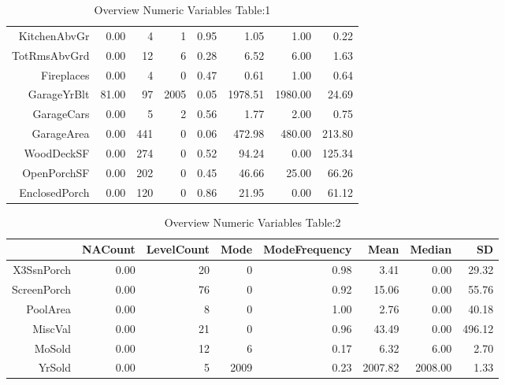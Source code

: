 \begin{table}[ht]
\begin{tabular}{rrrrrrrr}
  KitchenAbvGr & 0.00 &   4 &   1 & 0.95 & 1.05 & 1.00 & 0.22 \\ 
  TotRmsAbvGrd & 0.00 &  12 &   6 & 0.28 & 6.52 & 6.00 & 1.63 \\ 
  Fireplaces & 0.00 &   4 &   0 & 0.47 & 0.61 & 1.00 & 0.64 \\ 
  GarageYrBlt & 81.00 &  97 & 2005 & 0.05 & 1978.51 & 1980.00 & 24.69 \\ 
  GarageCars & 0.00 &   5 &   2 & 0.56 & 1.77 & 2.00 & 0.75 \\ 
  GarageArea & 0.00 & 441 &   0 & 0.06 & 472.98 & 480.00 & 213.80 \\ 
  WoodDeckSF & 0.00 & 274 &   0 & 0.52 & 94.24 & 0.00 & 125.34 \\ 
  OpenPorchSF & 0.00 & 202 &   0 & 0.45 & 46.66 & 25.00 & 66.26 \\ 
  EnclosedPorch & 0.00 & 120 &   0 & 0.86 & 21.95 & 0.00 & 61.12 \\ 
   \hline
\end{tabular}
\caption{Overview Numeric Variables Table:1} 
\label{tab:numeric.overview1}
\end{table}

\begin{table}[ht]
\centering
\begin{tabular}{rrrrrrrr}
  \hline
 & NACount & LevelCount & Mode & ModeFrequency & Mean & Median & SD \\ 
  \hline
X3SsnPorch & 0.00 &  20 &   0 & 0.98 & 3.41 & 0.00 & 29.32 \\ 
  ScreenPorch & 0.00 &  76 &   0 & 0.92 & 15.06 & 0.00 & 55.76 \\ 
  PoolArea & 0.00 &   8 &   0 & 1.00 & 2.76 & 0.00 & 40.18 \\ 
  MiscVal & 0.00 &  21 &   0 & 0.96 & 43.49 & 0.00 & 496.12 \\ 
  MoSold & 0.00 &  12 &   6 & 0.17 & 6.32 & 6.00 & 2.70 \\ 
  YrSold & 0.00 &   5 & 2009 & 0.23 & 2007.82 & 2008.00 & 1.33 \\ 
   \hline
\end{tabular}
\caption{Overview Numeric Variables Table:2} 
\label{tab:numeric.overview2}
\end{table}

